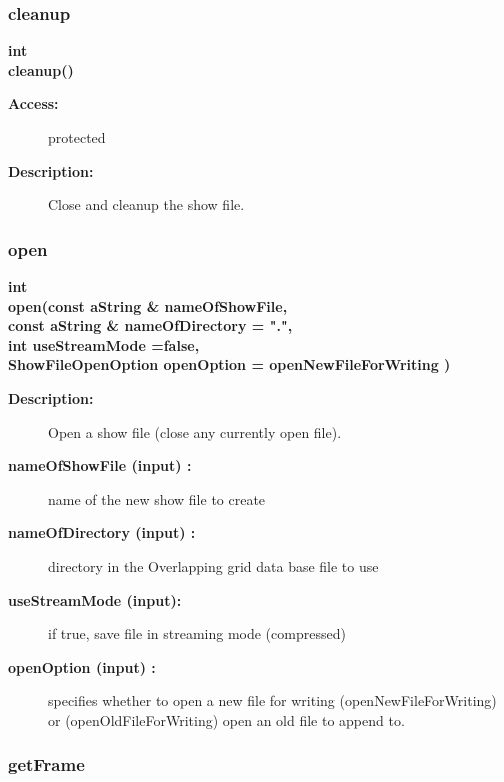 \subsubsection{cleanup}
 
\begin{flushleft} \textbf{%
int  \\ 
\settowidth{\OgshowIncludeArgIndent}{cleanup(}%
cleanup()
}\end{flushleft}
\begin{description}
\item[{\bf Access:}]  protected
\item[{\bf Description:}] 
     Close and cleanup the show file.
\end{description}
\subsubsection{open}
 
\begin{flushleft} \textbf{%
int  \\ 
\settowidth{\OgshowIncludeArgIndent}{open(}%
open(const aString \& nameOfShowFile, \\ 
\hspace{\OgshowIncludeArgIndent}const aString \& nameOfDirectory  = ".",\\ 
\hspace{\OgshowIncludeArgIndent}int useStreamMode  =false,\\ 
\hspace{\OgshowIncludeArgIndent}ShowFileOpenOption openOption = openNewFileForWriting )
}\end{flushleft}
\begin{description}
\item[{\bf Description:}] 
     Open a show file (close any currently open file).
\item[{\bf nameOfShowFile (input) :}]  name of the new show file to create
\item[{\bf nameOfDirectory (input) :}]  directory in the Overlapping grid data base file to use
\item[{\bf useStreamMode (input):}]  if true, save file in streaming mode (compressed)
\item[{\bf openOption (input) :}]  specifies whether to open a new file for writing (openNewFileForWriting) or
    (openOldFileForWriting) open an old file to append to. 
\end{description}
\subsubsection{getFrame}
 
